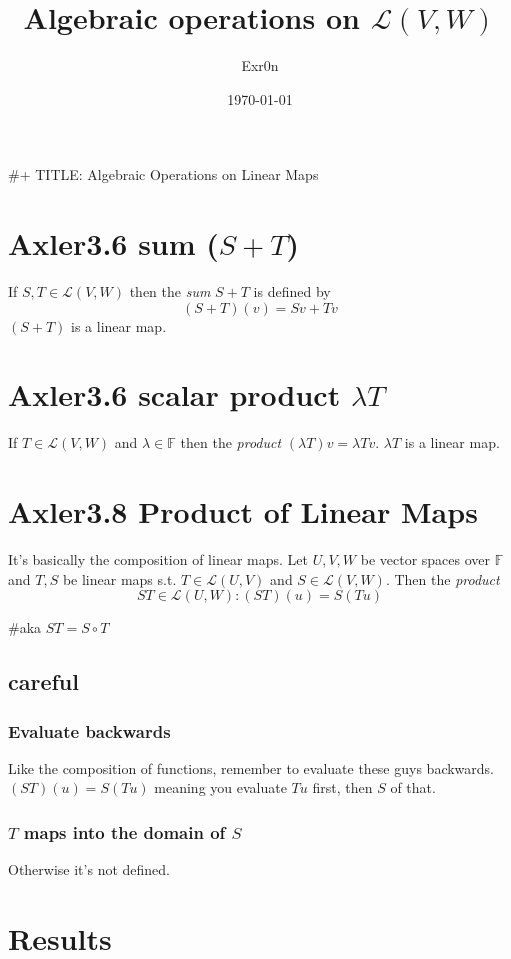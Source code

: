 \documentclass[letterpaper]{article}
\author{Exr0n}
\date{\today}
\title{Algebraic operations on \(\mathcal{L}(V, W)\)}
\renewcommand{\tableofcontents}{}
\begin{document}
\tableofcontents

\#+ TITLE: Algebraic Operations on Linear Maps

\section{Axler3.6 sum (\(S+T\))}
\label{sec:org6e358c6}
If \(S, T \in \mathcal{L}(V, W)\) then the \emph{sum} \(S + T\) is defined by
$$ (S+T)(v) = Sv + Tv $$
\((S+T)\) is a linear map.

\section{Axler3.6 scalar product \(\lambda T\)}
\label{sec:org5114b95}
If \(T \in \mathcal{L}(V, W)\) and \(\lambda \in \mathbb{F}\) then the \emph{product} \((\lambda T)v = \lambda Tv\). \(\lambda T\) is a linear map.

\section{Axler3.8 Product of Linear Maps}
\label{sec:org5ed0258}
It's basically the composition of linear maps. Let \(U, V, W\) be vector spaces over \(\mathbb F\) and \(T, S\) be linear maps s.t. \(T \in \mathcal L(U, V)\) and \(S \in \mathcal L(V, W)\). Then the \emph{product}
$$ ST \in \mathcal L (U, W) : (ST)(u) = S(Tu) $$

\#aka \(ST = S \circ T\)

\subsection{careful}
\label{sec:org936f3b3}

\subsubsection{Evaluate backwards}
\label{sec:org8a8a376}
Like the composition of functions, remember to evaluate these guys backwards. \((ST)(u) = S(Tu)\) meaning you evaluate \(Tu\) first, then \(S\) of that.

\subsubsection{\(T\) maps into the domain of \(S\)}
\label{sec:org07361dd}
Otherwise it's not defined.

\section{Results}
\label{sec:org27d399e}
\end{document}
